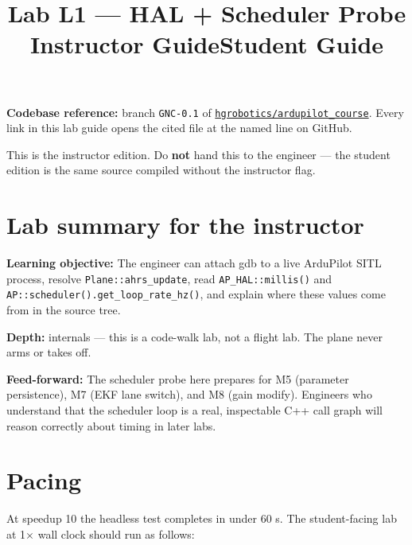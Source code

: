 \documentclass[a4paper,11pt,twoside]{article}
\title{Lab L1 --- HAL + Scheduler Probe\\
  \large \ifinstructor Instructor Guide\else Student Guide\fi}
\author{\copyrightline}
\date{}
\begin{document}
\maketitle

\noindent\textbf{Codebase reference:} branch \texttt{GNC-0.1} of \href{\repourl}{\nolinkurl{hgrobotics/ardupilot_course}}. Every link in this lab guide opens the cited file at the named line on GitHub.

\bigskip

\ifinstructor

\begin{tcolorbox}[colback=red!5!white,colframe=red!40!black,title=Instructor edition]
This is the instructor edition. Do \textbf{not} hand this to the engineer --- the student edition is the same source compiled without the instructor flag.
\end{tcolorbox}

\section*{Lab summary for the instructor}

\textbf{Learning objective:} The engineer can attach gdb to a live ArduPilot SITL process, resolve \texttt{Plane::ahrs\_update}, read \texttt{AP\_HAL::millis()} and \texttt{AP::scheduler().get\_loop\_rate\_hz()}, and explain where these values come from in the source tree.

\textbf{Depth:} internals --- this is a code-walk lab, not a flight lab. The plane never arms or takes off.

\textbf{Feed-forward:} The scheduler probe here prepares for M5 (parameter persistence), M7 (EKF lane switch), and M8 (gain modify). Engineers who understand that the scheduler loop is a real, inspectable C++ call graph will reason correctly about timing in later labs.

\section*{Pacing}

At speedup 10 the headless test completes in under 60 s. The student-facing lab at 1$\times$ wall clock should run as follows:
\end{document}
